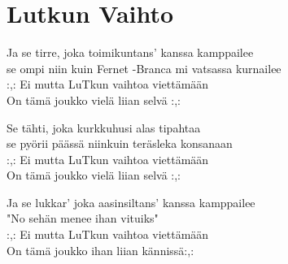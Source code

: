 \section{Lutkun Vaihto}
Ja se tirre, joka toimikuntans' kanssa kamppailee\\
se ompi niin kuin Fernet -Branca mi vatsassa kurnailee\\
:,: Ei mutta LuTkun vaihtoa viettämään\\
On tämä joukko vielä liian selvä :,:

Se tähti, joka kurkkuhusi alas tipahtaa\\
se pyörii päässä niinkuin teräsleka konsanaan\\
:,: Ei mutta LuTkun vaihtoa viettämään\\
On tämä joukko vielä liian selvä :,:

Ja se lukkar' joka aasinsiltans' kanssa kamppailee\\
"No sehän menee ihan vituiks"\\
:,: Ei mutta LuTkun vaihtoa viettämään\\
On tämä joukko ihan liian kännissä:,: